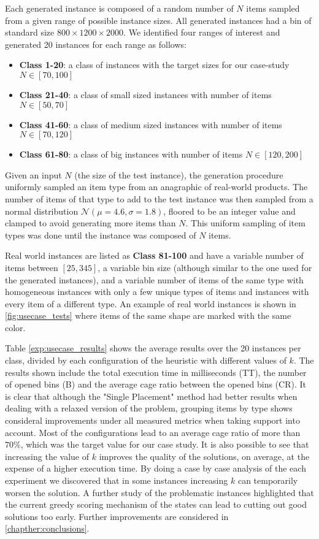 Each generated instance is composed of a random number of $N$ items sampled from a given range of possible instance sizes. All generated instances had a bin of standard size $800 \times 1200 \times 2000$.
We identified four ranges of interest and generated 20 instances for each range as follows:
\begin{itemize}
    \item \textbf{Class 1-20}: a class of instances with the target sizes for our case-study $N \in [70,100]$
    \item \textbf{Class 21-40}: a class of small sized instances with number of items $N \in [50,70]$
    \item \textbf{Class 41-60}: a class of medium sized instances with number of items $N \in [70,120]$
    \item \textbf{Class 61-80}: a class of big instances with number of items $N \in [120,200]$
\end{itemize}

Given an input $N$ (the size of the test instance), the generation procedure uniformly sampled an item type from an anagraphic of real-world products. The number of items of that type to add to the test instance was then sampled from a normal distribution $\mathcal{N}(\mu = 4.6, \sigma = 1.8)$, floored to be an integer value and clamped to avoid generating more items than $N$. 
This uniform sampling of item types was done until the instance was composed of $N$ items.

Real world instances are listed as \textbf{Class 81-100} and have a variable number of items between $[25, 345]$, a variable bin size (although similar to the one used for the generated instances), and a variable number of items of the same type with homogeneous instances with only a few unique types of items and instances with every item of a different type.
An example of real world instances is shown in \cref{fig:usecase_tests} where items of the same shape are marked with the same color.

Table \ref{exp:usecase_results} shows the average results over the 20 instances per class, divided by each configuration of the heuristic with different values of $k$. The results shown include the total execution time in milliseconds (TT), the number of opened bins (B) and the average cage ratio between the opened bins (CR). It is clear that although the "Single Placement" method had better results when dealing with a relaxed version of the problem, grouping items by type shows consideral improvements under all measured metrics when taking support into account.
Most of the configurations lead to an average cage ratio of more than $70\%$, which was the target value for our case study.
It is also possible to see that increasing the value of $k$ improves the quality of the solutions, on average, at the expense of a higher execution time.
By doing a case by case analysis of the each experiment we discovered that in some instances increasing $k$ can temporarily worsen the solution. 
A further study of the problematic instances highlighted that the current greedy scoring mechanism of the states can lead to cutting out good solutions too early. 
Further improvements are considered in \cref{chapther:conclusions}.
\label{exp:usecase_results}

